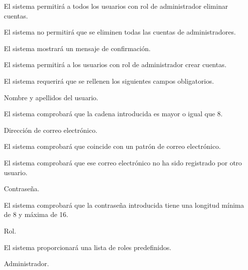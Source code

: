 \begin{enumitem}[label=\bfseries{RAdm \arabic*.},leftmargin=*]
	\item El sistema permitirá a todos los usuarios con rol de administrador eliminar cuentas.
	\begin{enumitem}[label*=\bfseries{\arabic*.}]
		\item El sistema no permitirá que se eliminen todas las cuentas de administradores.
		\item El sistema mostrará un mensaje de confirmación.
	\end{enumitem}
	\item El sistema permitirá a los usuarios con rol de administrador crear cuentas.
	\begin{enumitem}[label*=\bfseries{\arabic*.}]
		\item El sistema requerirá que se rellenen los siguientes campos obligatorios.
		\begin{enumitem}[label*=\bfseries{\arabic*.}]
			\item Nombre y apellidos del usuario.
			\begin{enumitem}[label*=\bfseries{\arabic*.}]
				\item El sistema comprobará que la cadena introducida es mayor o igual que 8.
			\end{enumitem}
			\item Dirección de correo electrónico.
			\begin{enumitem}[label*=\bfseries{\arabic*.}]
				\item El sistema comprobará que coincide con un patrón de correo electrónico.
				\item El sistema comprobará que ese correo electrónico no ha sido registrado por otro usuario.
			\end{enumitem}
			\item Contraseña.
			\begin{enumitem}[label*=\bfseries{\arabic*.}]
				\item El sistema comprobará que la contraseña introducida tiene una longitud mínima de 8 y máxima de 16.
			\end{enumitem}
			\item Rol.
			\begin{enumitem}[label*=\bfseries{\arabic*.}]
				\item El sistema proporcionará una lista de roles predefinidos.
				\begin{enumitem}[label*=\bfseries{\arabic*.}]
					\item Administrador.

\end{enumitem}
\end{enumitem}
\end{enumitem}
\end{enumitem}
\end{enumitem}

